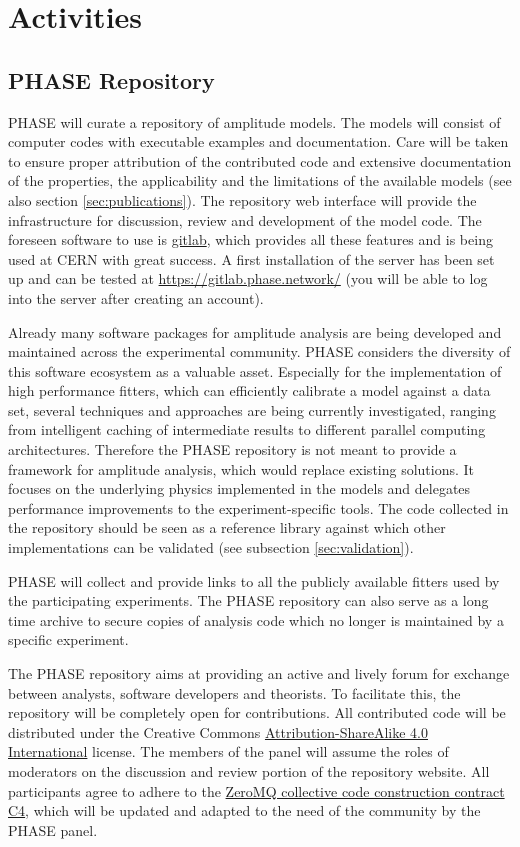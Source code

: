 \section{Activities}
\label{sec:activities}

\subsection{PHASE Repository}
\label{sec:repo}
PHASE will curate a repository of amplitude models. The models will consist of computer codes with executable examples and documentation. Care will be taken to ensure proper attribution of the contributed code and extensive documentation of the properties, the applicability and the limitations of the available models (see also section \ref{sec:publications}). The repository web interface will provide the infrastructure for discussion, review and development of the model code. The foreseen software to use is \href{https://about.gitlab.com/}{gitlab}, which provides all these features and is being used at CERN with great success. A first installation of the server has been set up and can be tested at \url{https://gitlab.phase.network/} (you will be able to log into the server after creating an account).

Already many software packages for amplitude analysis are being developed and maintained across the experimental community. PHASE considers the diversity of this software ecosystem as a valuable asset. Especially for the implementation of high performance fitters, which can efficiently calibrate a model against a data set, several techniques and approaches are being currently investigated, ranging from intelligent caching of intermediate results to different parallel computing architectures. Therefore the PHASE repository is not meant to provide a framework for amplitude analysis, which would replace existing solutions. It focuses on the underlying physics implemented in the models and delegates performance improvements to the experiment-specific tools. The code collected in the repository should be seen as a reference library against which other implementations can be validated (see subsection \ref{sec:validation}). 

PHASE will collect and provide links to all the publicly available fitters used by the participating experiments. The PHASE repository can also serve as a long time archive to secure copies of analysis code which no longer is maintained by a specific experiment.

The PHASE repository aims at providing an active and lively forum for exchange between analysts, software developers and theorists. To facilitate this, the repository will be completely open for contributions. All contributed code will be distributed under the Creative Commons
\href{https://creativecommons.org/licenses/by-sa/4.0/}{Attribution-ShareAlike 4.0 International} license. The members of the panel will assume the roles of moderators on the discussion and review portion of the repository website. All participants agree to adhere to the \href{https://rfc.zeromq.org/spec:42/C4/}{ZeroMQ collective code construction contract C4}, which will be updated and adapted to the need of the community by the PHASE panel.


